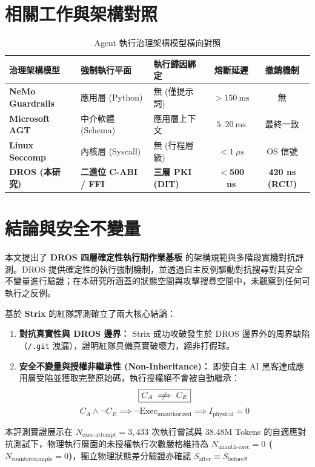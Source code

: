\documentclass[conference]{IEEEtran}
\begin{document}
\section{相關工作與架構對照}

\begin{table}[h]
\caption{Agent 執行治理架構模型橫向對照}
\label{tab:related_work_zh}
\centering
\begin{tabularx}{\columnwidth}{l Y Y c c}
\toprule
\textbf{治理架構模型} & \textbf{強制執行平面} & \textbf{執行歸因綁定} & \textbf{熔斷延遲} & \textbf{撤銷機制} \\
\midrule
\textbf{NeMo Guardrails} & 應用層 (Python) & 無 (僅提示詞) & $>150\ \text{ms}$ & 無 \\
\textbf{Microsoft AGT} & 中介軟體 (Schema) & 應用層上下文 & $5\text{--}20\ \text{ms}$ & 最終一致 \\
\textbf{Linux Seccomp} & 內核層 (Syscall) & 無 (行程層級) & $<1\ \mu\text{s}$ & OS 信號 \\
\textbf{DROS (本研究)} & \textbf{二進位 C-ABI / FFI} & \textbf{三層 PKI (DIT)} & \textbf{$<$500 ns} & \textbf{420 ns (RCU)} \\
\bottomrule
\end{tabularx}
\end{table}

\section{結論與安全不變量}
本文提出了 \textbf{DROS 四層確定性執行期作業基板} 的架構規範與多階段實機對抗評測。DROS 提供確定性的執行強制機制，並透過自主反例驅動對抗搜尋對其安全不變量進行驗證；在本研究所涵蓋的狀態空間與攻擊搜尋空間中，未觀察到任何可執行之反例。

基於 \textbf{Strix} 的紅隊評測確立了兩大核心結論：
\begin{enumerate}
    \item \textbf{對抗真實性與 DROS 邊界：} Strix 成功攻破發生於 DROS 邊界外的周界缺陷（\texttt{/.git} 洩漏），證明紅隊具備真實破壞力，絕非打假球。
    \item \textbf{安全不變量與授權非繼承性 (Non-Inheritance)：} 即使自主 AI 黑客達成應用層受陷並獲取完整原始碼，執行授權絕不會被自動繼承：
    \begin{equation}
    \boxed{C_A \centernot\implies C_E}
    \end{equation}
    \begin{equation}
    C_A \land \neg C_E \implies \neg \text{Exec}_{\text{unauthorized}} \implies I_{\text{physical}} = 0
    \end{equation}
\end{enumerate}
本評測實證展示在 $N_{\text{exec-attempt}} = 3,433$ 次執行嘗試與 38.48M Tokens 的自適應對抗測試下，物理執行層面的未授權執行次數嚴格維持為 \textbf{$N_{\text{unauth-exec}} = 0$ ($N_{\text{counterexample}} = 0$)}，獨立物理狀態差分驗證亦確認 $\boxed{S_{\text{after}} \equiv S_{\text{before}}}$。
\end{document}
